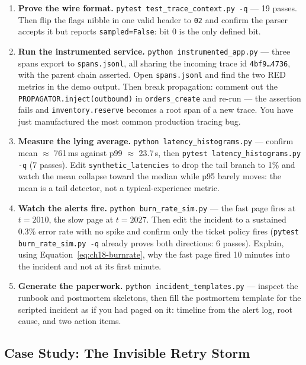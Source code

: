 \begin{enumerate}
  \item \textbf{Prove the wire format.} \texttt{pytest test\_trace\_context.py -q}
        --- 19 passes. Then flip the flags nibble in one valid header to
        \texttt{02} and confirm the parser accepts it but reports
        \texttt{sampled=False}: bit 0 is the only defined bit.
  \item \textbf{Run the instrumented service.} \texttt{python instrumented\_app.py}
        --- three spans export to \texttt{spans.jsonl}, all sharing the
        incoming trace id \texttt{4bf9\ldots4736}, with the parent chain
        asserted. Open \texttt{spans.jsonl} and find the two RED metrics in
        the demo output. Then break propagation: comment out the
        \texttt{PROPAGATOR.inject(outbound)} in \texttt{orders\_create} and
        re-run --- the assertion fails and \texttt{inventory.reserve}
        becomes a root span of a new trace. You have just manufactured the
        most common production tracing bug.
  \item \textbf{Measure the lying average.} \texttt{python latency\_histograms.py}
        --- confirm mean $\approx$ 761\,ms against p99 $\approx$ 23.7\,s,
        then \texttt{pytest latency\_histograms.py -q} (7 passes). Edit
        \texttt{synthetic\_latencies} to drop the tail branch to 1\% and
        watch the mean collapse toward the median while p95 barely moves:
        the mean is a tail detector, not a typical-experience metric.
  \item \textbf{Watch the alerts fire.} \texttt{python burn\_rate\_sim.py}
        --- the fast page fires at $t{=}2010$, the slow page at $t{=}2027$.
        Then edit the incident to a sustained 0.3\% error rate with no
        spike and confirm only the ticket policy fires
        (\texttt{pytest burn\_rate\_sim.py -q} already proves both
        directions: 6 passes). Explain, using
        Equation~\eqref{eq:ch18-burnrate}, why the fast page fired 10
        minutes into the incident and not at its first minute.
  \item \textbf{Generate the paperwork.} \texttt{python incident\_templates.py}
        --- inspect the runbook and postmortem skeletons, then fill the
        postmortem template for the scripted incident as if you had paged
        on it: timeline from the alert log, root cause, and two action
        items.
\end{enumerate}

\subsection{Case Study: The Invisible Retry Storm}
\label{sec:ch18-case}

